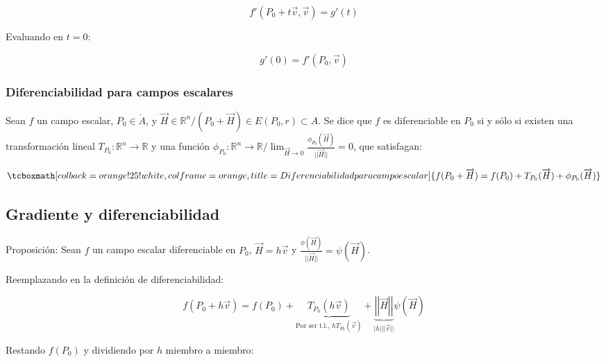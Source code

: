 \documentclass{article}
\renewcommand{\Bbb}{\mathbb}
\begin{document}
\begin{equation}
f'(P_0 + t \overrightarrow{v}, \overrightarrow{v}) = g'(t) 
\end{equation}

Evaluando en $t = 0$:

\begin{equation}
g'(0) = f'(P_0, \overrightarrow{v})
\end{equation}

\subsubsection{Diferenciabilidad para campos escalares}

Sean $f$ un campo escalar, $P_0 \in \mathring{A}$, y $\overrightarrow{H} \in \Bbb R^n / (P_0 + \overrightarrow{H}) \in E(P_0, r) \subset A$. Se dice que $f$ es diferenciable en $P_0$ si y sólo si existen una transformación lineal $T_{P_0}: \Bbb R^n \rightarrow \Bbb R$ y una función $\phi_{P_0}: \Bbb R^n \rightarrow \Bbb R / \lim_{\overrightarrow{H} \rightarrow 0} \frac{\phi_{P_0}(\overrightarrow{H})}{||\overrightarrow{H}||} = 0$, que satisfagan:

\begin{equation}
\tcboxmath[colback=orange!25!white,colframe=orange, title=Diferenciabilidad para campo escalar]
{ f(P_0 + \overrightarrow{H}) = f(P_0) + T_{P_0}(\overrightarrow{H}) + \phi_{P_0}(\overrightarrow{H}) }
\end{equation}

\subsection{Gradiente y diferenciabilidad}

Proposición: Sean $f$ un campo escalar diferenciable en $P_0$, $\overrightarrow{H} = h \overrightarrow{v}$ y $\frac{\phi(\overrightarrow{H})}{||\overrightarrow{H}||} = \psi(\overrightarrow{H})$.

Reemplazando en la definición de diferenciabilidad:

\begin{equation}
f(P_0 + h \overrightarrow{v}) = f(P_0) + \underbrace{ T_{P_0}(h \overrightarrow{v}) }_{\text{Por ser t.l., } h T_{P_0}(\overrightarrow{v})} + \underbrace{ \left|\left|\overrightarrow{H}\right|\right| }_{|h| ||\overrightarrow{v}||} \psi(\overrightarrow{H})
\end{equation}

Restando $f(P_0)$ y dividiendo por $h$ miembro a miembro:
\end{document}
